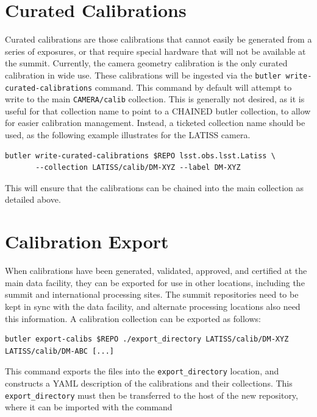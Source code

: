 \documentclass[DM,authoryear,toc]{lsstdoc}
\begin{document}
\section{Curated Calibrations}

Curated calibrations are those calibrations that cannot easily be generated from a series of exposures, or that require special hardware that will not be available at the summit.  Currently, the camera geometry calibration is the only curated calibration in wide use.   These calibrations will be ingested via the \verb|butler write-curated-calibrations| command.  This command by default will attempt to write to the main \verb|CAMERA/calib| collection.  This is generally not desired, as it is useful for that collection name to point to a CHAINED butler collection, to allow for easier calibration management.  Instead, a ticketed collection name should be used, as the following example illustrates for the LATISS camera.

\begin{verbatim}
butler write-curated-calibrations $REPO lsst.obs.lsst.Latiss \
       --collection LATISS/calib/DM-XYZ --label DM-XYZ
\end{verbatim}

This will ensure that the calibrations can be chained into the main collection as detailed above.

\section{Calibration Export}
\label{sec:calib_export}

When calibrations have been generated, validated, approved, and certified at the main data facility, they can be exported for use in other locations, including the summit and international processing sites.  The summit repositories need to be kept in sync with the data facility, and alternate processing locations also need this information.  A calibration collection can be exported as follows:

\begin{verbatim}
butler export-calibs $REPO ./export_directory LATISS/calib/DM-XYZ LATISS/calib/DM-ABC [...]
\end{verbatim}

This command exports the files into the \verb|export_directory| location, and constructs a YAML description of the calibrations and their collections.  This \verb|export_directory| must then be transferred to the host of the new repository, where it can be imported with the command
\end{document}
